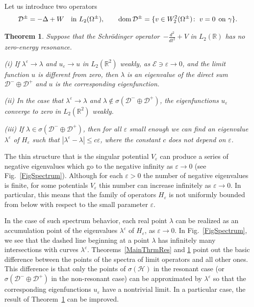 \documentclass[reqno]{amsart}
\theoremstyle{plain}
\newtheorem{thm}{Theorem}
\numberwithin{equation}{section}
\newcommand{\dom}{\mathop{\rm dom}}
\newcommand{\Real}{\mathbb R}
\newcommand{\eps}{\varepsilon}
\newcommand{\cE}{\mathcal{E}}
\newcommand{\lme}{\lambda^\eps}
\newcommand{\cH}{\mathcal{H}}
\renewcommand{\leq}{\leqslant}
\begin{document}
Let us introduce two operators
\begin{equation*}
  \mathcal{D}^\pm= -\Delta+W\quad\text{in }L_2(\Omega^\pm), \qquad \dom \mathcal{D}^\pm=\{v\in W_2^2(\Omega^\pm)\colon\; v=0 \;\,\mbox{on } \gamma\}.
\end{equation*}


\begin{thm}\label{MainThrmNoRes}
Suppose that the Schr\"odinger operator~$-\frac{d^2}{d t^2}+V$ in $L_2(\Real)$ has no zero-energy resonance.

 (i) If $\lme \to \lambda$ and $u_\eps \to u$ in $L_2(\Real^2)$ weakly, as $\cE\ni\eps\to 0$, and the limit function $u$ is different from zero, then
$\lambda$ is an eigenvalue of the direct sum $\mathcal{D}^-\oplus\mathcal{D}^+$ and $u$ is the corresponding eigenfunction.


(ii) In the case that $\lme \to \lambda$ and $\lambda\not\in \sigma(\mathcal{D}^-\oplus\mathcal{D}^+)$, the eigenfunctions $u_\eps$ converge to zero in $L_2(\Real^2)$ weakly.

(iii) If $\lambda\in \sigma(\mathcal{D}^-\oplus\mathcal{D}^+)$, then for all $\eps$ small enough we can find  an eigenvalue $\lme$ of $H_\eps$ such that
$ |\lme-\lambda|\leq c\eps$,
where the constant $c$ does not depend on $\eps$.
\end{thm}




The thin structure that is the singular potential $V_\eps$ can produce a series of negative eigenvalues which go to the negative infinity as $\eps\to 0$ (see Fig.~\ref{FigSpectrum}). Although for each $\eps>0$ the number of negative eigenvalues is finite, for some potentials $V_\eps$ this number can increase infinitely as $\eps\to 0$.  In particular, this means that the family of operators $H_\eps$ is not uniformly bounded from below with respect to the small parameter $\eps$.

In the case of such spectrum behavior, each real point $\lambda$ can be realized as an accumulation point of the eigenvalues $\lme$ of $H_\eps$,  as $\eps\to 0$. In Fig.~\ref{FigSpectrum}, we see that the dashed line beginning at a point $\lambda$ has infinitely many intersections with curves $\lme$.
Theorems~\ref{MainThrmRes} and  \ref{MainThrmNoRes} point out the basic difference between the points of the spectra of  limit operators and all other ones. This difference is that only the points of $\sigma(\cH)$ in the resonant case (or $\sigma(\mathcal{D}^-\oplus\mathcal{D}^+)$ in the non-resonant case) can be approximated by $\lme$ so that the corresponding eigenfunctions $u_\eps$  have a nontrivial limit.
In a particular case, the result of Theorem~\ref{MainThrmNoRes} can be improved.
\end{document}
